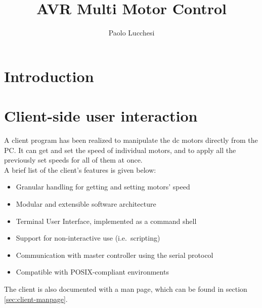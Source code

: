 \documentclass[binding=0.6cm,Lau]{sapthesis}
\title{AVR Multi Motor Control}
\author{Paolo Lucchesi}
\begin{document}
\frontmatter
\maketitle

\dedication{
Dedicated to my family, my granddad Pietro, my mom Anna Rosa, my dad Marco,
my grandmom Pierina and my sister Valentina, which I thank everyday for
everything I am.\\
To my dearest friends in Pitigliano, with whom I share some of the most
beautiful memories I have.\\
To Nicola, with whom I have shared part of this path; he helped me in a
dark period of my life and he is one of my dearest friends.
}

\begin{abstract}
\end{abstract}

\tableofcontents


\mainmatter

\chapter{Introduction}
\label{ch:intro}


\chapter{Client-side user interaction}
\label{ch:client}
A client program has been realized to manipulate the dc motors directly from the
PC. It can get and set the speed of individual motors, and to apply all the
previously set speeds for all of them at once.\\ A brief list of the
client's features is given below:
\begin{itemize}
  \item Granular handling for getting and setting motors' speed
  \item Modular and extensible software architecture
  \item Terminal User Interface, implemented as a command shell
  \item Support for non-interactive use (i.e.\ scripting)
  \item Communication with master controller using the serial protocol
  \item Compatible with POSIX-compliant environments
\end{itemize}
The client is also documented with a man page, which can be found in section
\ref{sec:client-manpage}.
\end{document}
